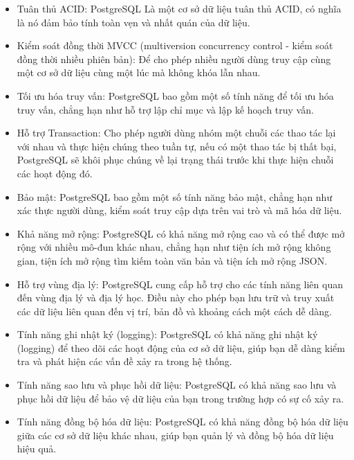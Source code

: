 \begin{itemize}
    \item Tuân thủ ACID: PostgreSQL Là một cơ sở dữ liệu tuân thủ ACID, có nghĩa là nó
đảm bảo tính toàn vẹn và nhất quán của dữ liệu.
    \item Kiểm soát đồng thời MVCC (multiversion concurrency control - kiểm soát đồng
thời nhiều phiên bản): Để cho phép nhiều người dùng truy cập cùng một cơ sở dữ
liệu cùng một lúc mà không khóa lẫn nhau.
    \item Tối ưu hóa truy vấn: PostgreSQL bao gồm một số tính năng để tối ưu hóa truy
vấn, chẳng hạn như hỗ trợ lập chỉ mục và lập kế hoạch truy vấn.
    \item Hỗ trợ Transaction: Cho phép người dùng nhóm một chuỗi các thao tác lại với
nhau và thực hiện chúng theo tuần tự, nếu có một thao tác bị thất bại, PostgreSQL
sẽ khôi phục chúng về lại trạng thái trước khi thực hiện chuỗi các hoạt động đó.
    \item Bảo mật: PostgreSQL bao gồm một số tính năng bảo mật, chẳng hạn như xác
thực người dùng, kiểm soát truy cập dựa trên vai trò và mã hóa dữ liệu.
    \item Khả năng mở rộng: PostgreSQL có khả năng mở rộng cao và có thể được mở
rộng với nhiều mô-đun khác nhau, chẳng hạn như tiện ích mở rộng không gian,
tiện ích mở rộng tìm kiếm toàn văn bản và tiện ích mở rộng JSON.
    \item Hỗ trợ vùng địa lý: PostgreSQL cung cấp hỗ trợ cho các tính năng liên quan đến
vùng địa lý và địa lý học. Điều này cho phép bạn lưu trữ và truy xuất các dữ liệu
liên quan đến vị trí, bản đồ và khoảng cách một cách dễ dàng.
    \item Tính năng ghi nhật ký (logging): PostgreSQL có khả năng ghi nhật ký (logging)
để theo dõi các hoạt động của cơ sở dữ liệu, giúp bạn dễ dàng kiểm tra và phát hiện các vấn đề xảy ra trong hệ thống.
    \item Tính năng sao lưu và phục hồi dữ liệu: PostgreSQL có khả năng sao lưu và phục
hồi dữ liệu để bảo vệ dữ liệu của bạn trong trường hợp có sự cố xảy ra.
    \item Tính năng đồng bộ hóa dữ liệu: PostgreSQL có khả năng đồng bộ hóa dữ liệu
giữa các cơ sở dữ liệu khác nhau, giúp bạn quản lý và đồng bộ hóa dữ liệu hiệu quả.

\end{itemize}
